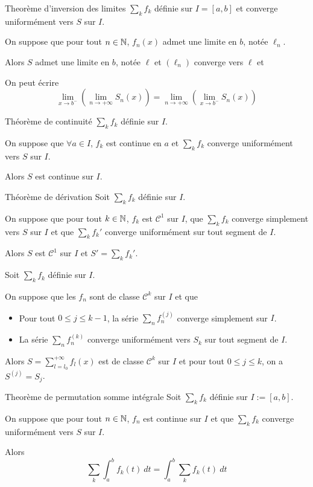 \documentclass[a4paper, 12pt]{article}
\begin{document}
\begin{theoreme}{Theorème d'inversion des limites}{}
    $\sum_k f_k$ définie sur $I = [a, b]$ et converge uniformément vers $S$ sur $I$.

    On suppose que pour tout $n \in \mathbb{N}$, $f_n(x)$ admet une limite en $b$, notée $\ell_n$.

    Alors $S$ admet une limite en $b$, notée $\ell$ et $(\ell_n)$ converge vers $\ell$ et
\end{theoreme}

\begin{remarque}
    On peut écrire
    $$
    \lim\limits_{x \to b^-} \left( \lim\limits_{n \to +\infty} S_n(x) \right) = \lim\limits_{n \to +\infty} \left( \lim\limits_{x \to b^-} S_n(x) \right)
    $$
\end{remarque}

\begin{theoreme}{Théorème de continuité}{}
    $\sum_k f_k$ définie sur $I$.

    On suppose que $\forall a \in I$, $f_k$ est continue en $a$ et $\sum_k f_k$ converge uniformément vers $S$ sur $I$.

    Alors $S$ est continue sur $I$.
\end{theoreme}

\begin{theoreme}{Théorème de dérivation}{}
    Soit $\sum_k f_k$ définie sur $I$.

    On suppose que pour tout $k \in \mathbb{N}$, $f_k$ est $\mathcal{C}^1$ sur $I$, que $\sum_k f_k$ converge simplement vers $S$ sur $I$ et que $\sum_k f_k'$ converge uniformément sur tout segment de $I$.

    Alors $S$ est $\mathcal{C}^1$ sur $I$ et $S' = \sum_k f_k'$.
\end{theoreme}

\begin{proposition}{}{}
    Soit $\sum_k f_k$ définie sur $I$.

    On suppose que les $f_n$ sont de classe $\mathcal{C}^k$ sur $I$ et que
    \begin{itemize}[label=--]
        \item Pour tout $0 \leq j \leq k - 1$, la série $\sum_n f_n^{(j)}$ converge simplement sur $I$.
        \item La série $\sum_n f_n^{(k)}$ converge uniformément vers $S_k$ sur tout segment de $I$.
    \end{itemize}
    Alors $S = \sum_{l = l_0}^{+\infty} f_l(x)$ est de classe $\mathcal{C}^k$ sur $I$ et pour tout $0 \leq j \leq k$, on a $S^{(j)} = S_j$.
\end{proposition}

\begin{theoreme}{Theorème de permutation somme intégrale}{}
    Soit $\sum_k f_k$ définie sur $I := [a, b]$.

    On suppose que pour tout $n \in \mathbb{N}$, $f_n$ est continue sur $I$ et que $\sum_k f_k$ converge uniformément vers $S$ sur $I$.

    Alors
    $$
    \sum_k \int_a^b f_k(t) \ dt = \int_a^b \sum_k f_k(t) \ dt
    $$
\end{theoreme}
\end{document}
